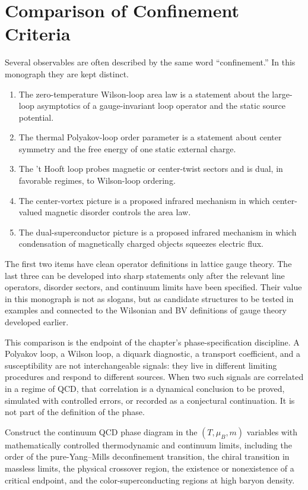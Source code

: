\section{Comparison of Confinement Criteria}

Several observables are often described by the same word ``confinement.''  In
this monograph they are kept distinct.

\begin{enumerate}
  \item The zero-temperature Wilson-loop area law is a statement about the
  large-loop asymptotics of a gauge-invariant loop operator and the static
  source potential.
  \item The thermal Polyakov-loop order parameter is a statement about
  center symmetry and the free energy of one static external charge.
  \item The 't Hooft loop probes magnetic or center-twist sectors and is
  dual, in favorable regimes, to Wilson-loop ordering.
  \item The center-vortex picture is a proposed infrared mechanism in which
  center-valued magnetic disorder controls the area law.
  \item The dual-superconductor picture is a proposed infrared mechanism in
  which condensation of magnetically charged objects squeezes electric flux.
\end{enumerate}

The first two items have clean operator definitions in lattice gauge theory.
The last three can be developed into sharp statements only after the
relevant line operators, disorder sectors, and continuum limits have been
specified.  Their value in this monograph is not as slogans, but as candidate
structures to be tested in examples and connected to the Wilsonian and BV
definitions of gauge theory developed earlier.

This comparison is the endpoint of the chapter's phase-specification
discipline.  A Polyakov loop, a Wilson loop, a diquark diagnostic, a
transport coefficient, and a susceptibility are not interchangeable signals:
they live in different limiting procedures and respond to different sources.
When two such signals are correlated in a regime of QCD, that correlation is
a dynamical conclusion to be proved, simulated with controlled errors, or
recorded as a conjectural continuation.  It is not part of the definition of
the phase.

\begin{openproblem}
\label{op:qcd-phase-diagram-controlled-errors}
Construct the continuum QCD phase diagram in the \((T,\mu_B,m)\) variables
with mathematically controlled thermodynamic and continuum limits, including
the order of the pure-Yang--Mills deconfinement transition, the chiral
transition in massless limits, the physical crossover region, the existence
or nonexistence of a critical endpoint, and the color-superconducting
regions at high baryon density.
\end{openproblem}
